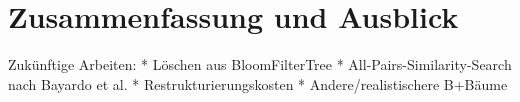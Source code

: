 \chapter{Zusammenfassung und Ausblick}\label{ch:zusammenfassung}

Zukünftige Arbeiten: 
* Löschen aus BloomFilterTree
* All-Pairs-Similarity-Search nach Bayardo et al. 
* Restrukturierungskosten 
* Andere/realistischere B+Bäume